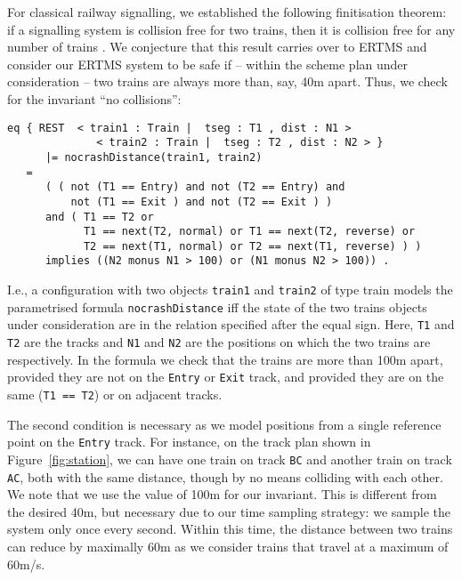 For classical railway signalling, we established the following
finitisation theorem: if a signalling system is collision free for two
trains, then it is collision free for any number of
trains \cite{sttt14}. We conjecture that this result carries over to
ERTMS and consider our ERTMS system to be safe if -- within the scheme
plan under consideration -- two trains are always more than, say, 40m
apart. Thus, we check for the invariant ``no collisions'':
%
\begin{lstlisting}[columns=fixed]
   eq { REST  < train1 : Train |  tseg : T1 , dist : N1 >
              < train2 : Train |  tseg : T2 , dist : N2 > }
      |= nocrashDistance(train1, train2) 
   =
      ( ( not (T1 == Entry) and not (T2 == Entry) and 
          not (T1 == Exit ) and not (T2 == Exit ) ) 
      and ( T1 == T2 or 
            T1 == next(T2, normal) or T1 == next(T2, reverse) or
            T2 == next(T1, normal) or T2 == next(T1, reverse) ) )
      implies ((N2 monus N1 > 100) or (N1 monus N2 > 100)) .
\end{lstlisting}
%
I.e., a configuration with two objects \verb|train1| and \verb|train2| of type
 train models the parametrised formula \verb|nocrashDistance| iff the
 state of the two trains objects under consideration are in the
 relation specified after the equal sign. Here, \verb|T1|
 and \verb|T2| are the tracks and \verb|N1| and
\verb|N2| are the positions on which the two trains are respectively.
In the formula we check that the trains are more than 100m apart,
provided 
%
they are not on the \verb|Entry| or \verb|Exit| track, and
%
provided they are on the same (\verb|T1 == T2|) or on adjacent tracks.

The second condition is necessary as we model positions from a single
reference point on the \verb|Entry| track. For instance, on the track
plan shown in Figure~\ref{fig:station}, we can have one train on track
\verb|BC| and another train on track \verb|AC|, both with the same
distance, though by no means colliding with each other.
%
We note that we use the value of 100m for our invariant. This is different
from the desired 40m, but necessary due to our time sampling
strategy: we sample the system only once every
second. Within this time, the distance between two trains can reduce
by maximally 60m as we consider trains that travel at a
maximum of 60m/s.

